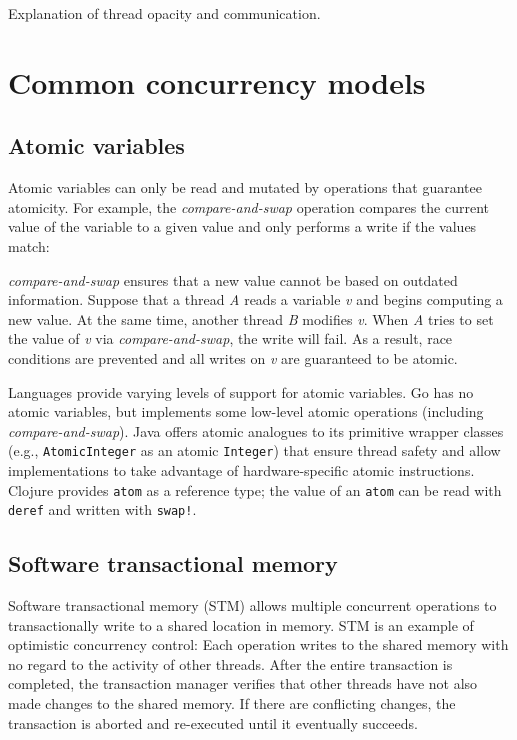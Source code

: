 \documentclass{sig-alternate}
\newcommand{\code}[1]{\texttt{#1}}
\begin{document}
Explanation of thread opacity and communication.

\section{Common concurrency models}

\subsection{Atomic variables}

Atomic variables can only be read and mutated by operations that guarantee atomicity. For example, the \emph{compare-and-swap} operation compares the current value of the variable to a given value and only performs a write if the values match:

\emph{compare-and-swap} ensures that a new value cannot be based on outdated information. Suppose that a thread \emph{A} reads a variable \emph{v} and begins computing a new value. At the same time, another thread \emph{B} modifies \emph{v}. When \emph{A} tries to set the value of \emph{v} via \emph{compare-and-swap}, the write will fail. As a result, race conditions are prevented and all writes on \emph{v} are guaranteed to be atomic.

Languages provide varying levels of support for atomic variables. Go has no atomic variables, but implements some low-level atomic operations (including \emph{compare-and-swap}). Java offers atomic analogues to its primitive wrapper classes (e.g., \code{AtomicInteger} as an atomic \code{Integer}) that ensure thread safety and allow implementations to take advantage of hardware-specific atomic instructions. Clojure provides \code{atom} as a reference type; the value of an \code{atom} can be read with \code{deref} and written with \code{swap!}.

\subsection{Software transactional memory}

Software transactional memory (STM) allows multiple concurrent operations to transactionally write to a shared location in memory. STM is an example of optimistic concurrency control: Each operation writes to the shared memory with no regard to the activity of other threads. After the entire transaction is completed, the transaction manager verifies that other threads have not also made changes to the shared memory. If there are conflicting changes, the transaction is aborted and re-executed until it eventually succeeds.~\cite{Shavit1995}
\end{document}
